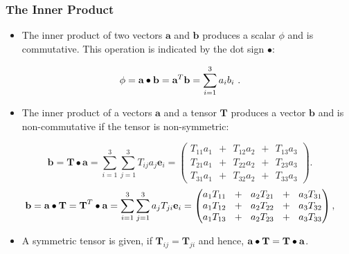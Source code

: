 \subsubsection{The Inner Product}
%
%
\begin{itemize}
    \item The inner product of two vectors $\textbf{a}$ and $\textbf{b}$
    produces a scalar $\phi$ and is commutative. This operation is indicated
    by the dot sign $\bullet$:
\end{itemize}
%
%
\begin{equation}
 \phi = \textbf{a} \bullet \textbf{b} = \textbf{a} ^T \textbf{b} = \sum_{i=1}^{3} a_i b_i ~.
 \label{EQUATION::innerProductVV}
\end{equation}
%
%
%
\begin{itemize}
    \item The inner product of a vectors $\textbf{a}$ and a tensor
    $\textbf{T}$ produces a vector $\textbf{b}$ and is non-commutative
    if the tensor is non-symmetric:
\end{itemize}
%
%
\begin{equation}
 \textbf{b} = \textbf{T} \bullet \textbf{a} =
 \sum_{i=1}^{3}\sum_{j=1}^{3} T_{ij} a_j   \textbf{e}_i
 =
  \left(
  \begin{matrix}
   T_{11} a_1 ~ ~ + ~ ~ T_{12} a_2 ~ ~ + ~ ~ T_{13} a_3 \\
   T_{21} a_1 ~ ~ + ~ ~ T_{22} a_2 ~ ~ + ~ ~ T_{23} a_3 \\
   T_{31} a_1 ~ ~ + ~ ~ T_{32} a_2 ~ ~ + ~ ~ T_{33} a_3
  \end{matrix}
  \right).
  \label{EQUATION::innerProductTV}
\end{equation}
%
%
\begin{equation}
 \textbf{b} = \textbf{a} \bullet \textbf{T}
 =
 \textbf{T} ^T \bullet \textbf{a}
 =
 \sum_{i=1}^{3}\sum_{j=1}^{3} a_j T_{ji}  \textbf{e}_i
 =
  \left(
  \begin{matrix}
   a_1 T_{11} ~ ~ + ~ ~ a_2 T_{21} ~ ~ + ~ ~ a_3 T_{31} \\
   a_1 T_{12} ~ ~ + ~ ~ a_2 T_{22} ~ ~ + ~ ~ a_3 T_{32} \\
   a_1 T_{13} ~ ~ + ~ ~ a_2 T_{23} ~ ~ + ~ ~ a_3 T_{33}
  \end{matrix}
  \right),
  \label{EQUATION::innerProductVT}
\end{equation}
%
%
\begin{itemize}
   \item[] A symmetric tensor is given, if $\textbf{T}_{ij} = \textbf{T}_{ji}$
   and hence, $\textbf{a}\bullet\textbf{T} = \textbf{T} \bullet \textbf{a}$.
\end{itemize}
%
%
%
%
%
%
%
%

